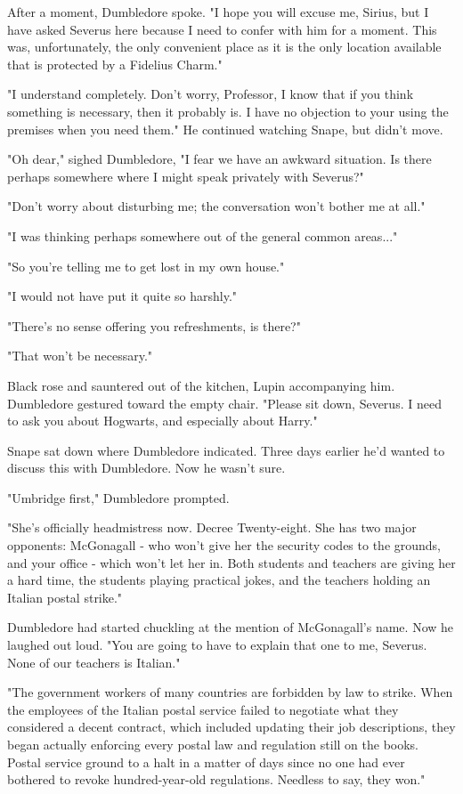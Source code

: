 \documentclass[a4paper,11pt]{article}
\begin{document}
After a moment, Dumbledore spoke. "I hope you will excuse me, Sirius, but I have asked Severus here because I need to confer with him for a moment. This was, unfortunately, the only convenient place as it is the only location available that is protected by a Fidelius Charm."

"I understand completely. Don't worry, Professor, I know that if you think something is necessary, then it probably is. I have no objection to your using the premises when you need them." He continued watching Snape, but didn't move.

"Oh dear," sighed Dumbledore, "I fear we have an awkward situation. Is there perhaps somewhere where I might speak privately with Severus?"

"Don't worry about disturbing me; the conversation won't bother me at all."

"I was thinking perhaps somewhere out of the general common areas..."

"So you're telling me to get lost in my own house."

"I would not have put it quite so harshly."

"There's no sense offering you refreshments, is there?"

"That won't be necessary."

Black rose and sauntered out of the kitchen, Lupin accompanying him. Dumbledore gestured toward the empty chair. "Please sit down, Severus. I need to ask you about Hogwarts, and especially about Harry."

Snape sat down where Dumbledore indicated. Three days earlier he'd wanted to discuss this with Dumbledore. Now he wasn't sure.

"Umbridge first," Dumbledore prompted.

"She's officially headmistress now. Decree Twenty-eight. She has two major opponents: McGonagall - who won't give her the security codes to the grounds, and your office - which won't let her in. Both students and teachers are giving her a hard time, the students playing practical jokes, and the teachers holding an Italian postal strike."

Dumbledore had started chuckling at the mention of McGonagall's name. Now he laughed out loud. "You are going to have to explain that one to me, Severus. None of our teachers is Italian."

"The government workers of many countries are forbidden by law to strike. When the employees of the Italian postal service failed to negotiate what they considered a decent contract, which included updating their job descriptions, they began actually enforcing every postal law and regulation still on the books. Postal service ground to a halt in a matter of days since no one had ever bothered to revoke hundred-year-old regulations. Needless to say, they won."
\end{document}
